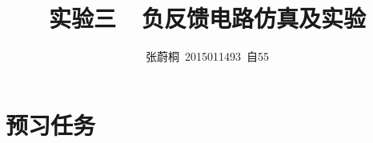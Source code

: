 \documentclass[UTF8,a4paper]{ctexart}
\title{实验三\ \ 负反馈电路仿真及实验}
\author{张蔚桐\ 2015011493\ 自55}
\begin{document}
\maketitle
\section{预习任务}
\end{document}
